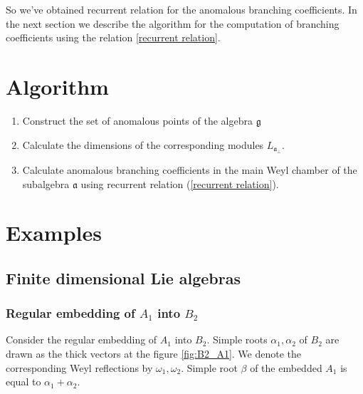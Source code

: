 \documentclass[a4paper,12pt]{article}
\theoremstyle{definition} \newtheorem{Def}{Definition}
\begin{document}
So we've obtained recurrent relation for the anomalous branching coefficients.  In the next section we describe the algorithm for the computation of branching coefficients using the relation \eqref{recurrent relation}. 

\section{Algorithm}
\label{sec:algorithm}
\begin{enumerate}
\item Construct the set of anomalous points of the algebra $\mathfrak{g}$
\item Calculate the dimensions of the corresponding modules $L_{\mathfrak{a}_{\bot}}$.
\item Calculate anomalous branching coefficients in the main Weyl
  chamber of the subalgebra $\mathfrak{a}$ using recurrent relation (\ref{recurrent relation}).
\end{enumerate}

\section{Examples}
\label{sec:examples}

\subsection{Finite dimensional Lie algebras}
\label{sec:finite-dimens-lie}

\subsubsection{Regular embedding of $A_1$ into $B_2$}
\label{sec:regul-embedd-a_1}

Consider the regular embedding of $A_1$ into $B_2$. Simple roots $\alpha_1, \alpha_2$ of $B_2$ are drawn as the thick vectors at the figure \ref{fig:B2_A1}. We denote the corresponding Weyl reflections by $\omega_1, \omega_2$. Simple root $\beta$ of the embedded $A_1$ is equal to $\alpha_1+\alpha_2$.
\end{document}

